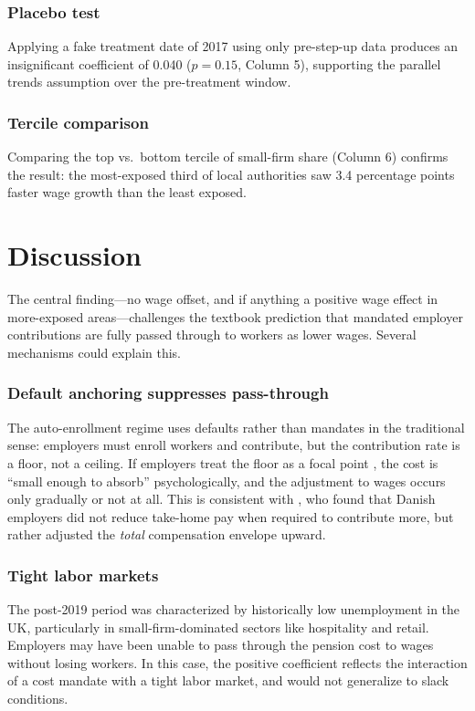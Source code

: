 \documentclass[12pt]{article}
\begin{document}
\subsubsection*{Placebo test} Applying a fake treatment date of 2017 using only pre-step-up data produces an insignificant coefficient of 0.040 ($p = 0.15$, Column 5), supporting the parallel trends assumption over the pre-treatment window.

\subsubsection*{Tercile comparison} Comparing the top vs.\ bottom tercile of small-firm share (Column 6) confirms the result: the most-exposed third of local authorities saw 3.4 percentage points faster wage growth than the least exposed.




\section{Discussion}
\label{sec:discussion}

The central finding---no wage offset, and if anything a positive wage effect in more-exposed areas---challenges the textbook prediction that mandated employer contributions are fully passed through to workers as lower wages. Several mechanisms could explain this.

\subsubsection*{Default anchoring suppresses pass-through} The auto-enrollment regime uses defaults rather than mandates in the traditional sense: employers must enroll workers and contribute, but the contribution rate is a floor, not a ceiling. If employers treat the floor as a focal point \citep{thaler2004}, the cost is ``small enough to absorb'' psychologically, and the adjustment to wages occurs only gradually or not at all. This is consistent with \citet{chetty2014}, who found that Danish employers did not reduce take-home pay when required to contribute more, but rather adjusted the \textit{total} compensation envelope upward.

\subsubsection*{Tight labor markets} The post-2019 period was characterized by historically low unemployment in the UK, particularly in small-firm-dominated sectors like hospitality and retail. Employers may have been unable to pass through the pension cost to wages without losing workers. In this case, the positive coefficient reflects the interaction of a cost mandate with a tight labor market, and would not generalize to slack conditions.
\end{document}

